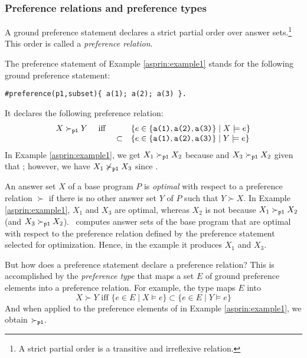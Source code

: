 \subsubsection{Preference relations and preference types}
A ground preference statement declares a 
strict partial order over answer sets.\footnote{A strict partial order is a transitive and irreflexive relation.}
This order is called a \emph{preference relation}.
\begin{example}
The preference statement of Example \ref{asprin:example1} stands for the following ground preference statement:
\begin{lstlisting}[numbers=none]
#preference(p1,subset){ a(1); a(2); a(3) }.
\end{lstlisting}
It declares the following preference relation:
\[
\begin{array}{cccl}
X \succ_{\texttt{p1}} Y & \text{ iff } &         & \{e\in \{\texttt{a(1)},\texttt{a(2)},\texttt{a(3)}\} \mid X\models e\} \\ 
                      &              & \subset & \{e\in \{\texttt{a(1)},\texttt{a(2)},\texttt{a(3)}\} \mid Y\models e\}
\end{array}
\]
In Example \ref{asprin:example1}, 
we get
$X_1\succ_{\texttt{p1}}X_2$ because 
and $X_3\succ_{\texttt{p1}}X_2$ given that ;
however, we have $X_1\not\succ_{\texttt{p1}}X_3$ since . 
\end{example}
An answer set $X$ of a base program $P$ is \emph{optimal} with respect to a preference relation $\succ$
if there is no other answer set $Y$ of $P$ such that $Y \succ X$.
In Example \ref{asprin:example1}, 
$X_1$ and $X_3$ are optimal,
whereas $X_2$ is not because $X_1 \succ_{\texttt{p1}} X_2$ (and $X_3 \succ_{\texttt{p1}} X_2$).
\asprin\ computes answer sets of the base program
that are optimal with respect to the preference relation 
defined by the preference statement selected for optimization.
Hence, in the example it produces $X_1$ and $X_3$.

But how does a preference statement declare a preference relation?
This is accomplished by the \emph{preference type}
that maps a set $E$ of ground preference elements into a preference relation.
For example, the type  maps $E$ into
\[
X \succ Y \text{ iff } \{e\in E\mid X\models e\}\subset\{e\in E\mid Y\models e\}
\]
And when applied to the preference elements of  in Example \ref{asprin:example1}, we obtain $\succ_{\texttt{p1}}$.

